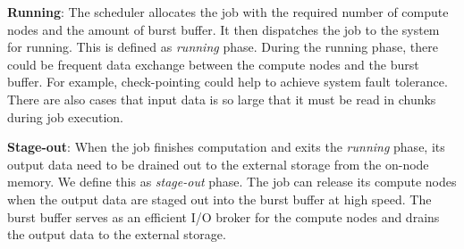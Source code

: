 \textbf{Running}: The scheduler allocates the job with the required
         number of compute nodes and the amount of burst buffer. 
         It then dispatches the job to the system for running.
         This is defined as \textit{running} phase.
         During the running phase, there could be frequent data exchange
         between the compute nodes and the burst buffer.
         For example, check-pointing could help to achieve system fault tolerance.
         There are also cases that input data is so large that it must be read in
         chunks during job execution.
 
\textbf{Stage-out}: When the job finishes computation and
         exits the \textit{running} phase, its output data need to be drained out
         to the external storage from the on-node memory. We define this as \textit{stage-out} phase.
         The job can release its compute nodes when the output data are staged out
         into the burst buffer at high speed. The burst buffer serves as an efficient
         I/O broker for the compute nodes and drains the output data to the external storage.





